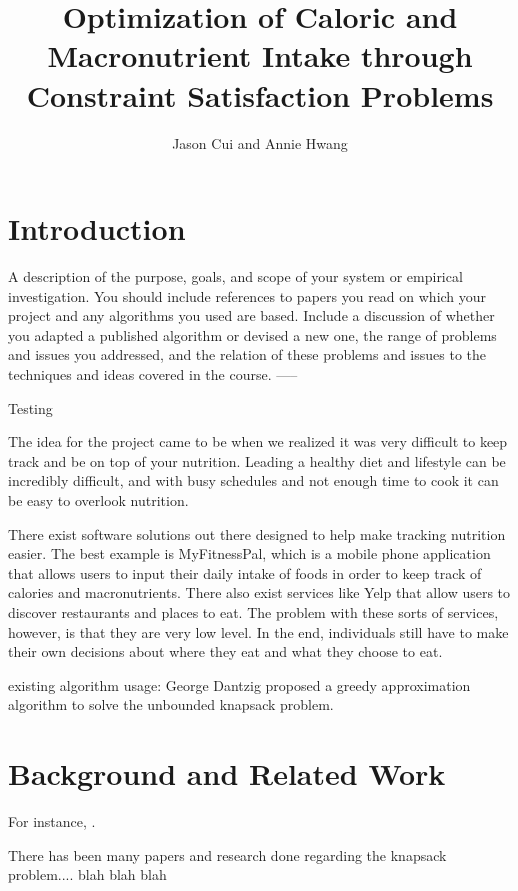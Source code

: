 \documentclass[11pt]{article}
\title{Optimization of Caloric and Macronutrient Intake through Constraint Satisfaction Problems}
\author{Jason Cui and Annie Hwang}
\begin{document}
\maketitle{}


\section{Introduction}

A description of the purpose, goals, and scope of your system or
empirical investigation.  You should include references to papers you
read on which your project and any algorithms you used are
based. Include a discussion of whether you adapted a published
algorithm or devised a new one, the range of problems and issues you
addressed, and the relation of these problems and issues to the
techniques and ideas covered in the course.
-----

Testing

The idea for the project came to be when we realized it was very difficult to keep track and be on top of your nutrition. Leading a healthy diet and lifestyle can be incredibly difficult, and with busy schedules and not enough time to cook it can be easy to overlook nutrition.


There exist software solutions out there designed to help make tracking nutrition easier. The best example is MyFitnessPal, which is a mobile phone application that allows users to input their daily intake of foods in order to keep track of calories and macronutrients. There also exist services like Yelp that allow users to discover restaurants and places to eat. The problem with these sorts of services, however, is that they are very low level. In the end, individuals still have to make their own decisions about where they eat and what they choose to eat.

existing algorithm usage: George Dantzig proposed a greedy approximation algorithm to solve the unbounded knapsack problem.

\section{Background and Related Work}

For instance, \cite{hochreiter1997long}.\par
\vspace{2mm}
\noindent There has been many papers and research done regarding the knapsack problem.... blah blah blah
\end{document}
